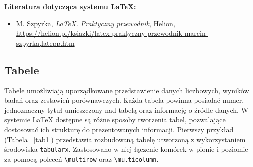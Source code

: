 \textbf{Literatura dotycząca systemu \LaTeX{}:}
\begin{itemize}
    \item M. Szpyrka, \textit{\LaTeX{}. Praktyczny przewodnik}, Helion,
    \url{https://helion.pl/ksiazki/latex-praktyczny-przewodnik-marcin-szpyrka,latepp.htm}
\end{itemize}

\subsection{Tabele}


Tabele umożliwiają uporządkowane przedstawienie danych liczbowych, wyników badań oraz zestawień porównawczych. Każda tabela powinna posiadać numer, jednoznaczny tytuł umieszczony nad tabelą oraz informację o źródle danych. W systemie \LaTeX{} dostępne są różne sposoby tworzenia tabel, pozwalające dostosować ich strukturę do prezentowanych informacji. Pierwszy przykład (Tabela ~\ref{tab1}) przedstawia rozbudowaną tabelę utworzoną z wykorzystaniem środowiska \texttt{tabularx}. Zastosowano w niej łączenie komórek w pionie i poziomie za pomocą poleceń \verb|\multirow| oraz \verb|\multicolumn|.

